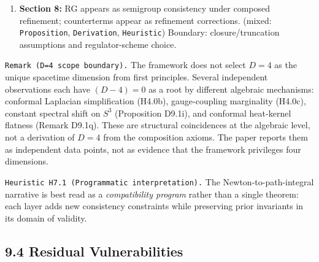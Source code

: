 \documentclass[
]{article}
\begin{document}
\begin{enumerate}
  conjugation additionally modifies the connection via a drift term,
  producing the DeWitt curvature coupling \(R/6\) at each Riemann normal
  coordinate center (on general curved manifolds \(V_{\mathrm{HD}}\) is
  position-dependent; \texttt{Remark\ D9.1n}) rather than the
  Weyl/Stratonovich value \(R/8\) (\texttt{Remark\ D4.1e},
  \texttt{Remark\ D9.1p}). Crucially, the conjugation \(\Delta_{1/2}\)
  is unitarily equivalent to \(-\Delta_g\) and therefore spectrally
  identical to the bare Laplacian; the genuine ordering ambiguity lives
  in the shifted operator \(-\Delta_g + V_{\mathrm{HD}}\), which has a
  distinct spectrum (\texttt{Remark\ D9.1q}). (mixed:
  \texttt{Proposition}, \texttt{Derivation}, \texttt{Heuristic})
  Boundary: formal/asymptotic deformation setting and scope of
  equivalence; curved-manifold scope for connection-level differences.
\item
  \textbf{Section 8:} RG appears as semigroup consistency under composed
  refinement; counterterms appear as refinement corrections. (mixed:
  \texttt{Proposition}, \texttt{Derivation}, \texttt{Heuristic})
  Boundary: closure/truncation assumptions and regulator-scheme choice.
\end{enumerate}

\texttt{Remark\ (D=4\ scope\ boundary).} The framework does not select
\(D=4\) as the unique spacetime dimension from first principles. Several
independent observations each have \((D{-}4)=0\) as a root by different
algebraic mechanisms: conformal Laplacian simplification (H4.0b),
gauge-coupling marginality (H4.0c), constant spectral shift on \(S^3\)
(Proposition D9.1i), and conformal heat-kernel flatness (Remark D9.1q).
These are structural coincidences at the algebraic level, not a
derivation of \(D=4\) from the composition axioms. The paper reports
them as independent data points, not as evidence that the framework
privileges four dimensions.

\texttt{Heuristic\ H7.1\ (Programmatic\ interpretation).} The
Newton-to-path-integral narrative is best read as a \emph{compatibility
program} rather than a single theorem: each layer adds new consistency
constraints while preserving prior invariants in its domain of validity.

\subsection{9.4 Residual
Vulnerabilities}\label{residual-vulnerabilities}
\end{document}
